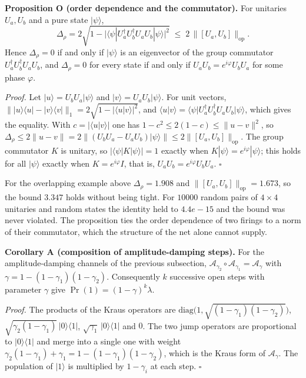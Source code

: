 \documentclass[final,3p,times]{elsarticle}
\begin{document}
\noindent\textbf{Proposition O (order dependence and the commutator).} For unitaries $U_a,U_b$ and a pure state $|\psi\rangle$,
\begin{equation}
 \Delta_\rho=2\sqrt{1-\big|\langle\psi|U_a^\dagger U_b^\dagger U_aU_b|\psi\rangle\big|^2}\;\le\;2\,\big\|[U_a,U_b]\big\|_{\mathrm{op}} .
\end{equation}
Hence $\Delta_\rho=0$ if and only if $|\psi\rangle$ is an eigenvector of the group commutator $U_a^\dagger U_b^\dagger U_aU_b$, and $\Delta_\rho=0$ for every state if and only if $U_aU_b=e^{i\varphi}U_bU_a$ for some phase $\varphi$.

\noindent\textit{Proof.} Let $|u\rangle=U_bU_a|\psi\rangle$ and $|v\rangle=U_aU_b|\psi\rangle$. For unit vectors, $\||u\rangle\langle u|-|v\rangle\langle v|\|_1=2\sqrt{1-|\langle u|v\rangle|^2}$, and $\langle u|v\rangle=\langle\psi|U_a^\dagger U_b^\dagger U_aU_b|\psi\rangle$, which gives the equality. With $c=|\langle u|v\rangle|$ one has $1-c^2\le2(1-c)\le\|u-v\|^2$, so $\Delta_\rho\le2\|u-v\|=2\|(U_bU_a-U_aU_b)|\psi\rangle\|\le2\|[U_a,U_b]\|_{\mathrm{op}}$. The group commutator $K$ is unitary, so $|\langle\psi|K|\psi\rangle|=1$ exactly when $K|\psi\rangle=e^{i\varphi}|\psi\rangle$; this holds for all $|\psi\rangle$ exactly when $K=e^{i\varphi}I$, that is, $U_aU_b=e^{i\varphi}U_bU_a$. $\square$

For the overlapping example above $\Delta_\rho=1.908$ and $\|[U_a,U_b]\|_{\mathrm{op}}=1.673$, so the bound $3.347$ holds without being tight. For $10000$ random pairs of $4\times4$ unitaries and random states the identity held to $4.4e-15$ and the bound was never violated. The proposition ties the order dependence of two firings to a norm of their commutator, which the structure of the net alone cannot supply.

\noindent\textbf{Corollary A (composition of amplitude-damping steps).} For the amplitude-damping channels of the previous subsection, $\mathcal A_{\gamma_2}\circ\mathcal A_{\gamma_1}=\mathcal A_{\gamma}$ with $\gamma=1-(1-\gamma_1)(1-\gamma_2)$. Consequently $k$ successive open steps with parameter $\gamma$ give $\Pr(1)=(1-\gamma)^k\lambda$.

\noindent\textit{Proof.} The products of the Kraus operators are $\mathrm{diag}\big(1,\sqrt{(1-\gamma_1)(1-\gamma_2)}\big)$, $\sqrt{\gamma_2(1-\gamma_1)}\,|0\rangle\langle1|$, $\sqrt{\gamma_1}\,|0\rangle\langle1|$ and $0$. The two jump operators are proportional to $|0\rangle\langle1|$ and merge into a single one with weight $\gamma_2(1-\gamma_1)+\gamma_1=1-(1-\gamma_1)(1-\gamma_2)$, which is the Kraus form of $\mathcal A_\gamma$. The population of $|1\rangle$ is multiplied by $1-\gamma_i$ at each step. $\square$
\end{document}
